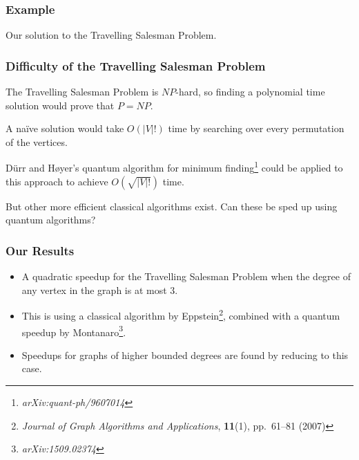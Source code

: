 \documentclass[]{beamer}
\begin{document}
\begin{frame}
\frametitle{Example}
\begin{center}

 Our solution to the Travelling Salesman Problem.
\end{center}
\end{frame}

\begin{frame}
\frametitle{Difficulty of the Travelling Salesman Problem}
The Travelling Salesman Problem is $NP$-hard, so finding a polynomial time solution would prove that $P = NP$.

A na\"ive solution would take $O(|V|!)$ time by searching over every permutation of the vertices.

D\"urr and H\o yer's quantum algorithm for minimum finding\footnote{{\em arXiv:quant-ph/9607014}} could be applied to this approach to achieve $O(\sqrt{|V|!})$ time.

But other more efficient classical algorithms exist. Can these be sped up using quantum algorithms?
\end{frame}

\begin{frame}
\frametitle{Our Results}
\begin{itemize}
\item A quadratic speedup for the Travelling Salesman Problem when the degree of any vertex in the graph is at most $3$.
\item This is using a classical algorithm by Eppstein\footnote{{\em Journal of Graph Algorithms and Applications}, {\bf 11}(1), pp.\ 61--81 (2007)}, combined with a quantum speedup by Montanaro\footnote{{\em arXiv:1509.02374}}.
\item Speedups for graphs of higher bounded degrees are found by reducing to this case.
\end{itemize}
\end{frame}
\end{document}
